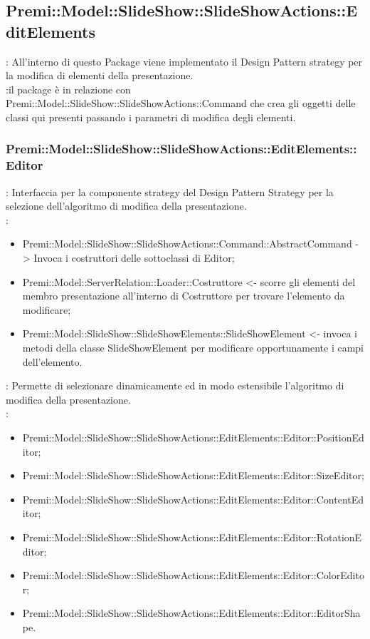    \subsection{Premi::Model::SlideShow::SlideShowActions::EditElements}{
		\textbf{\tipo}: All’interno di questo Package viene implementato il Design Pattern strategy per la modifica di elementi della presentazione.\\
		\textbf{\relaz}:il package è in relazione con Premi::Model::SlideShow::SlideShowActions::Command che crea gli oggetti delle classi qui presenti passando i parametri di modifica degli elementi.\\
	
	\subsubsection{Premi::Model::SlideShow::SlideShowActions::EditElements::Editor}{
		\textbf{\tipo}: Interfaccia per la componente strategy del Design Pattern Strategy per la selezione dell'algoritmo di modifica della presentazione.\\	
		\textbf{\relaz}:
		\begin{itemize}
			\item Premi::Model::SlideShow::SlideShowActions::Command::AbstractCommand -> Invoca i costruttori delle sottoclassi di Editor; 
            \item Premi::Model::ServerRelation::Loader::Costruttore <- scorre gli elementi del membro presentazione all’interno di Costruttore per trovare l’elemento da modificare;
            \item Premi::Model::SlideShow::SlideShowElements::SlideShowElement <- invoca i metodi della classe SlideShowElement per modificare opportunamente i campi dell’elemento.
		\end{itemize} 
		\textbf{\interfacce}: Permette di selezionare dinamicamente ed in modo estensibile l'algoritmo di modifica della presentazione.\\
        \textbf{\figli}: 
        \begin{itemize}
            \item Premi::Model::SlideShow::SlideShowActions::EditElements::Editor::PositionEditor;
            \item Premi::Model::SlideShow::SlideShowActions::EditElements::Editor::SizeEditor;
            \item Premi::Model::SlideShow::SlideShowActions::EditElements::Editor::ContentEditor;
            \item Premi::Model::SlideShow::SlideShowActions::EditElements::Editor::RotationEditor;
            \item Premi::Model::SlideShow::SlideShowActions::EditElements::Editor::ColorEditor;
            \item Premi::Model::SlideShow::SlideShowActions::EditElements::Editor::EditorShape.
        \end{itemize}
	}
}
